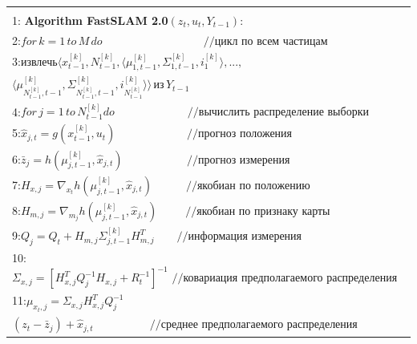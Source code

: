 \documentclass[10pt,a4paper]{article}
\begin{document}
\begin{table}[H]
\begin{center}
\begin{tabular}{|l|}
\hline
{}\\
1:\textbf{ Algorithm FastSLAM 2.0}$(z_t,u_t,Y_{t-1}):$\\
2:\hspace{5mm}$\textit{for}\,k=1\,\textit{to}\,M\,\textit{do}\qquad\qquad\quad\qquad\qquad//\textit{цикл по всем частицам}$\\
3:\hspace{10mm}$\textit{извлечь}\langle x_{t-1}^{[k]},N_{t-1}^{[k]},\langle\mu_{1,t-1}^{[k]},\varSigma_{1,t-1}^{[k]},i_1^{[k]}\rangle,...,$\\
\hspace{30mm}$\langle\mu_{N_{t-1}^{[k]},t-1}^{[k]},\varSigma_{N_{t-1}^{[k]},t-1}^{[k]},i_{N_{t-1}^{[k]}}^{[k]}\rangle\rangle\,\textit{из}\,Y_{t-1}$\\
4:\hspace{10mm}$\textit{for}\,j=1\,\textit{to}\,N_{t-1}^{[k]}\textit{do}\,\,\,\qquad\qquad\qquad//\textit{вычислить распределение выборки}$\\
5:\hspace{13mm}$\hat{x}_{j,t}=g(x_{t-1}^{[k]},u_t)\,\,\qquad\qquad\qquad//\textit{прогноз положения}$\\
6:\hspace{13mm}$\bar{z}_j=h(\mu_{j,t-1}^{[k]},\hat{x}_{j,t})\,\,\,\,\quad\qquad\qquad//\textit{прогноз измерения}$\\
7:\hspace{13mm}$H_{x,j}=\nabla_{x_t}h(\mu_{j,t-1}^{[k]},\hat{x}_{j,t})\quad\qquad//\textit{якобиан по положению}$\\
8:\hspace{13mm}$H_{m,j}=\nabla_{m_j}h(\mu_{j,t-1}^{[k]},\hat{x}_{j,t})\,\,\,\quad\quad//\textit{якобиан по признаку карты}$\\
9:\hspace{13mm}$Q_j=Q_t+H_{m,j}\varSigma_{j,t-1}^{[k]}H_{m,j}^T\qquad//\textit{информация измерения}$\\
10:\hspace{12mm}$\varSigma_{x,j}=[H_{x,j}^TQ_j^{-1}H_{x,j}+R_t^{-1}]^{-1}\,\,//\textit{ковариация предполагаемого распределения}$\\
11:\hspace{12mm}$\mu_{x_t,j}=\varSigma_{x,j}H_{x,j}^TQ_j^{-1}$\\
\hspace{25mm}$(z_t-\bar{z}_j)+\hat{x}_{j,t}\qquad\qquad\quad//\textit{среднее предполагаемого распределения}$\\

\end{tabular}
\end{center}
\end{table}
\end{document}
